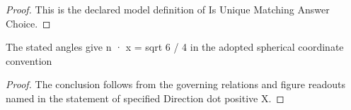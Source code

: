 \begin{proof}
  This is the declared model definition of Is Unique Matching Answer Choice.
\end{proof}
\begin{lemma}
  \label{lem:physics:phyx-mini-0541:phyxminiproblems-problemphyxmini0541-specifieddirection-dot-positivex}
  The stated angles give n · x = sqrt 6 / 4 in the adopted spherical coordinate convention
\end{lemma}
\begin{proof}
  The conclusion follows from the governing relations and figure readouts named in the statement of specified Direction dot positive X.
\end{proof}
